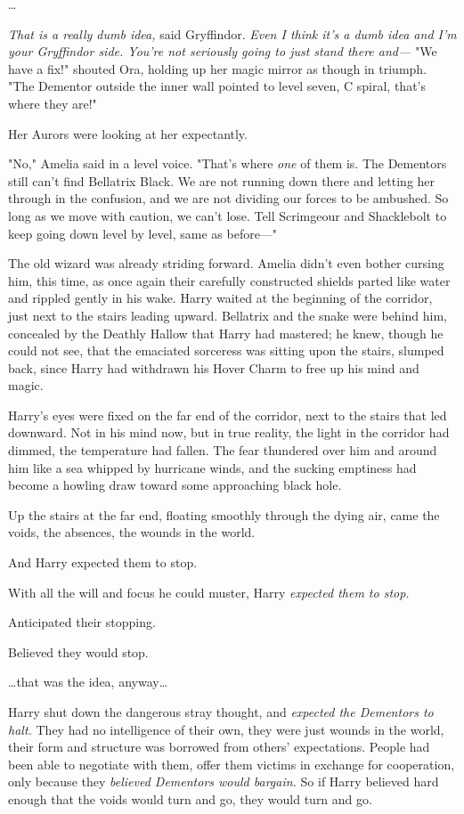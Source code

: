 {\ldots}

\emph{That is a really dumb idea,} said Gryffindor. \emph{Even I think it's a 
dumb idea and I'm your Gryffindor side. You're not seriously going to just 
stand there and---}
\sbreak
"We have a fix!" shouted Ora, holding up her magic mirror as though in triumph. 
"The Dementor outside the inner wall pointed to level seven, C spiral, that's 
where they are!"

Her Aurors were looking at her expectantly.

"No," Amelia said in a level voice. "That's where \emph{one} of them is. The 
Dementors still can't find Bellatrix Black. We are not running down there and 
letting her through in the confusion, and we are not dividing our forces to be 
ambushed. So long as we move with caution, we can't lose. Tell Scrimgeour and 
Shacklebolt to keep going down level by level, same as before---"

The old wizard was already striding forward. Amelia didn't even bother cursing 
him, this time, as once again their carefully constructed shields parted like 
water and rippled gently in his wake.
\sbreak
Harry waited at the beginning of the corridor, just next to the stairs leading 
upward. Bellatrix and the snake were behind him, concealed by the Deathly 
Hallow that Harry had mastered; he knew, though he could not see, that the 
emaciated sorceress was sitting upon the stairs, slumped back, since Harry had 
withdrawn his Hover Charm to free up his mind and magic.

Harry's eyes were fixed on the far end of the corridor, next to the stairs that 
led downward. Not in his mind now, but in true reality, the light in the 
corridor had dimmed, the temperature had fallen. The fear thundered over him 
and around him like a sea whipped by hurricane winds, and the sucking emptiness 
had become a howling draw toward some approaching black hole.

Up the stairs at the far end, floating smoothly through the dying air, came the 
voids, the absences, the wounds in the world.

And Harry expected them to stop.

With all the will and focus he could muster, Harry \emph{expected them to stop.}

Anticipated their stopping.

Believed they would stop.

{\ldots}that was the idea, anyway{\ldots}

Harry shut down the dangerous stray thought, and \emph{expected the Dementors 
to halt.} They had no intelligence of their own, they were just wounds in the 
world, their form and structure was borrowed from others' expectations. People 
had been able to negotiate with them, offer them victims in exchange for 
cooperation, only because they \emph{believed Dementors would bargain.} So if 
Harry believed hard enough that the voids would turn and go, they would turn 
and go.


